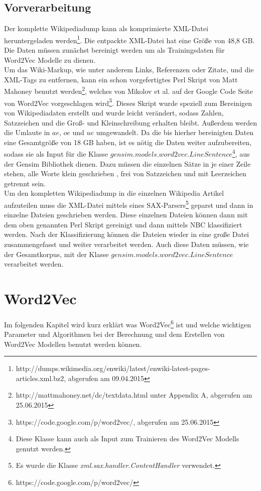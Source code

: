 \documentclass[12pt,a4paper]{report}
\begin{document}
	\section{Vorverarbeitung}
	\label{sec:Vorverarbeitung}
	Der komplette Wikipediadump kann als komprimierte XML-Datei heruntergeladen werden\footnote{http://dumps.wikimedia.org/enwiki/latest/enwiki-latest-pages-articles.xml.bz2, abgerufen am 09.04.2015}. Die entpackte XML-Datei hat eine Größe von 48,8 GB. Die Daten müssen zunächst bereinigt werden um als Trainingsdaten für Word2Vec Modelle zu dienen.\\		
	Um das Wiki-Markup, wie unter anderem Links, Referenzen oder Zitate, und die XML-Tags zu entfernen, kann ein schon vorgefertigtes Perl Skript von Matt Mahoney benutzt werden\footnote{http://mattmahoney.net/dc/textdata.html unter Appendix A, abgerufen am 25.06.2015}, welches von Mikolov et al. auf der Google Code Seite von Word2Vec vorgeschlagen wird\footnote{https://code.google.com/p/word2vec/, abgerufen am 25.06.2015}. Dieses Skript wurde speziell zum Bereinigen von Wikipediadaten erstellt und wurde leicht verändert, sodass Zahlen, Satzzeichen und die Groß- und Kleinschreibung erhalten bleibt. Außerdem werden die Umlaute in $ae$, $oe$ und $ue$ umgewandelt. Da die bis hierher bereinigten Daten eine Gesamtgröße von 18 GB haben, ist es nötig die Daten weiter aufzubereiten, sodass sie als Input für die Klasse $gensim.models.word2vec.LineSentence$\footnote{Diese Klasse kann auch als Input zum Trainieren des Word2Vec Modells genutzt werden.}, aus der Gensim Bibliothek dienen. Dazu müssen die einzelnen Sätze in je einer Zeile stehen, alle Worte klein geschrieben , frei von Satzzeichen und mit Leerzeichen getrennt sein.\\
	
	Um den kompletten Wikipediadump in die einzelnen Wikipedia Artikel aufzuteilen muss die XML-Datei mittels eines SAX-Parsers\footnote{Es wurde die Klasse \textit{xml.sax.handler.ContentHandler} verwendet.} geparst und dann in einzelne Dateien geschrieben werden. Diese einzelnen Dateien können dann mit dem oben genannten Perl Skript gereinigt und dann mittels NBC klassifiziert werden. Nach der Klassifizierung können die Dateien wieder in eine große Datei zusammengefasst und weiter verarbeitet werden. Auch diese Daten müssen, wie der Gesamtkorpus, mit der Klasse $gensim.models.word2vec.LineSentence$ verarbeitet werden.
\newpage
\chapter{Word2Vec}
Im folgenden Kapitel wird kurz erklärt was Word2Vec\footnote{https://code.google.com/p/word2vec/} ist und welche wichtigen Parameter und Algorithmen bei der Berechnung und dem Erstellen von Word2Vec Modellen benutzt werden können.\\
\end{document}
